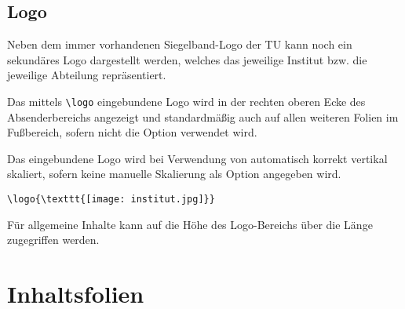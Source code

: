 
\subsection{Logo}

Neben dem immer vorhandenen Siegelband-Logo der TU kann noch ein sekundäres Logo
dargestellt werden, welches das jeweilige Institut bzw. die jeweilige Abteilung
repräsentiert.

\begin{Declaration}
\end{Declaration}

Das mittels \lstinline{\logo} eingebundene Logo wird in der rechten oberen
Ecke des Absenderbereichs angezeigt und standardmäßig auch auf allen weiteren
Folien im Fußbereich, sofern nicht die Option 
verwendet wird.

Das eingebundene Logo wird bei Verwendung von 
automatisch korrekt vertikal skaliert,
sofern keine manuelle Skalierung als Option angegeben wird.


\begin{example}
\begin{lstlisting}
\logo{\texttt{[image: institut.jpg]}}
\end{lstlisting}
\end{example}

\begin{Declaration}
\end{Declaration}

Für allgemeine Inhalte kann auf die Höhe des Logo-Bereichs über die Länge
 zugegriffen werden.

\section{Inhaltsfolien}

